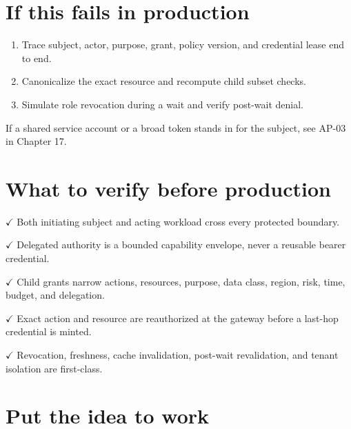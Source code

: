 \section{If this fails in production}

\begin{enumerate}

\item Trace subject, actor, purpose, grant, policy version, and credential lease end to end.

\item Canonicalize the exact resource and recompute child subset checks.

\item Simulate role revocation during a wait and verify post-wait denial.

\end{enumerate}

If a shared service account or a broad token stands in for the subject, see AP-03 in Chapter 17.\par

\section{What to verify before production}

\textbf{\ensuremath{\checkmark}} Both initiating subject and acting workload cross every protected boundary.\par

\textbf{\ensuremath{\checkmark}} Delegated authority is a bounded capability envelope, never a reusable bearer credential.\par

\textbf{\ensuremath{\checkmark}} Child grants narrow actions, resources, purpose, data class, region, risk, time, budget, and delegation.\par

\textbf{\ensuremath{\checkmark}} Exact action and resource are reauthorized at the gateway before a last-hop credential is minted.\par

\textbf{\ensuremath{\checkmark}} Revocation, freshness, cache invalidation, post-wait revalidation, and tenant isolation are first-class.\par

\section{Put the idea to work}

